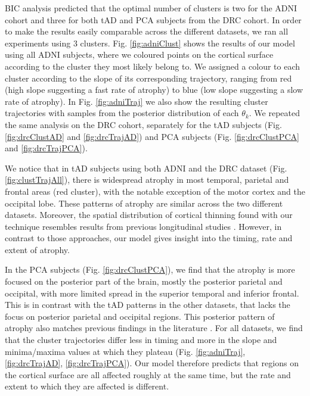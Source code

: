 BIC analysis predicted that the optimal number of clusters is two for the ADNI cohort and three for both tAD and PCA subjects from the DRC cohort. In order to make the results easily comparable across the different datasets, we ran all experiments using 3 clusters. Fig. \ref{fig:adniClust} shows the results of our model using all ADNI subjects, where we coloured points on the cortical surface according to the cluster they most likely belong to. We assigned a colour to each cluster according to the slope of its corresponding trajectory, ranging from red (high slope suggesting a fast rate of atrophy) to blue (low slope suggesting a slow rate of atrophy). In Fig. \ref{fig:adniTraj} we also show the resulting cluster trajectories with samples from the posterior distribution of each $\theta_k$. We repeated the same analysis on the DRC cohort, separately for the tAD subjects (Fig. \ref{fig:drcClustAD} and \ref{fig:drcTrajAD}) and PCA subjects (Fig. \ref{fig:drcClustPCA} and \ref{fig:drcTrajPCA}). 

We notice that in tAD subjects using both ADNI and the DRC dataset (Fig. \ref{fig:clustTrajAll}), there is widespread atrophy in most temporal, parietal and frontal areas (red cluster), with the notable exception of the motor cortex and the occipital lobe. These patterns of atrophy are similar across the two different datasets. Moreover, the spatial distribution of cortical thinning found with our technique resembles results from previous longitudinal studies \cite{dickerson2009cortical,thompson2001cortical}. However, in contrast to those approaches, our model gives insight into the timing, rate and extent of atrophy.

In the PCA subjects (Fig. \ref{fig:drcClustPCA}), we find that the atrophy is more focused on the posterior part of the brain, mostly the posterior parietal and occipital, with more limited spread in the superior temporal and inferior frontal. This is in contrast with the tAD patterns in the other datasets, that lacks the focus on posterior parietal and occipital regions. This posterior pattern of atrophy also matches previous findings in the literature \cite{crutch2012posterior}. For all datasets, we find that the cluster trajectories differ less in timing and more in the slope and minima/maxima values at which they plateau (Fig. \ref{fig:adniTraj}, \ref{fig:drcTrajAD}, \ref{fig:drcTrajPCA}). Our model therefore predicts that regions on the cortical surface are all affected roughly at the same time, but the rate and extent to which they are affected is different.   

